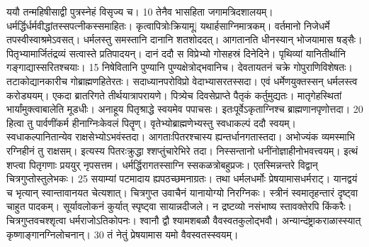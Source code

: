 ययौ तन्महिषीसाद्वी पुत्रस्नेहं विसृज्य च।
 10 तेनैव भासहिता जगामत्रिदशालयम्।
 धर्मर्द्धिर्धर्मवीद्धांतस्सपत्नीकस्समाहितः।
 कृत्वापित्रोःक्रियामू| यथार्हसाग्निमात्रकम्।
 वर्तमानो निजेधर्मे तपस्वीस्वाश्रमेऽवसत्।
 धर्मलस्तु समस्तानि दानानि शतशोददत्।
 आगतानति धीनस्यान् भोजयामास षड्सैः।
 पितृभ्यामार्जितंद्रव्यं सत्वास्ते प्रतिपादयन्।
 दानं ददौ स विप्रेभ्यो गोसहस्रं दिनेदिने।
 पृथिव्यां यानितीर्थानि गङ्गाद्यास्सरितश्चयाः।
 15 निषेवितानि पुण्यानि पुण्यक्षेत्रोद्भवानिच।
 देवतायतनं चक्रे गोपुराणिविशेषतः।
 तटाकोद्यानकारीच गोब्राह्मणहितेरतः।
 सदाध्यानपरोविप्रो वेदाभ्यासरतस्सदा।
 एवं धर्मेणयुक्तस्सन् धर्मलस्त्व करोड्ययम्।
 एकदा ब्रातरिगते तीर्थयात्रापरायणे।
 पित्र्येच दिवसेप्राप्ते पैतृकं कर्तुमुद्यतः।
 मातृगेहस्थितां भार्यांमुक्त्वाबालेति मूडधीः।
 अनाहूय पितृश्राद्धे स्वयमेव पपाचसः।
 इतःपूर्वेऽकृताग्निश्च ब्राह्मणानपृणोत्तदा।
 20
हित्वा तु पार्वणींकर्म हीनाग्निःकेवलं पितॄण्।
 वृतेभ्योब्राह्मणेभ्यस्तु स्वधाकल्पं ददौ स्वयम्।
 स्वधाकल्पानितान्येव राक्षसेभ्योऽभवंस्तदा।
 आगताःपितरश्चास्य ह्यन्तर्धानगतास्तदा।
 अभोज्यंक व्यमस्माभि रग्निहीनं तु राक्षसम्।
 इत्यस्य पितरःक्रुद्धा श्शप्तुंचारेभिरे तदा।
 निस्सन्तानो धनींनोज्ञाहीनोभवत्त्वयम्।
 इत्थं शप्त्वा पितृगणाः प्रययुर् नृपसत्तम।
 धर्मर्द्धिरागतस्साग्नि स्सकळत्रोबहुप्रजः।
 एतस्मिन्नन्तरे विद्वान् चित्रगुप्तोस्तुलेभकः।
 25 सयाम्यां पटमादाय ह्यपठच्छमनाग्रतः।
 तथा धर्मलधर्मोः प्रेषयामासधर्मराट्।
 यानद्वयं च भृत्यान् स्वान्तावानयत चेत्यशात्।
 चित्रगुप्त उवाचैनं यानायोग्यो निरग्निकः।
 स्त्रीनं स्वमातृहन्तारं दृष्ट्वा चाहुत पादकम्।
 सूर्यावलोकनं कुर्यात् स्पृष्ट्वा सायान्नदीजले।
 न द्रष्टव्यो नसंभाष्य स्तावक्तेरपि किंकरैः।
 चित्रगुप्तवचश्शृत्वा धर्मराजोऽतिकोपनः।
 श्वानौ द्वौ श्यामशबळौ वैवस्वतकुलोद्भवौ।
 अन्यान्दंष्ट्राकराळास्स्यात्
कृष्णाङ्गानग्निलोचनान्।
 30 तं नेतुं प्रेषयामास यमो वैवस्वतस्स्वयम्।
 
